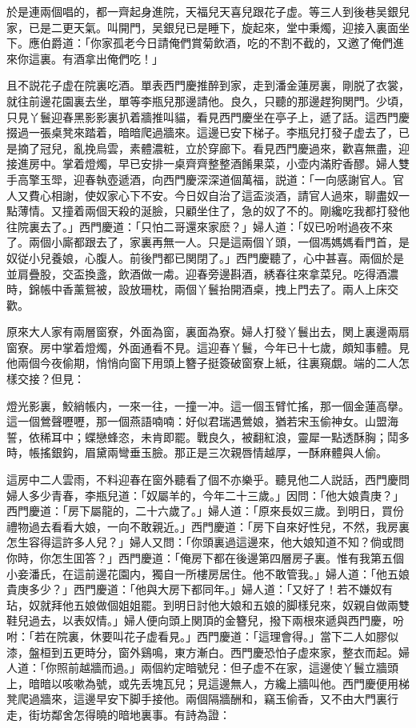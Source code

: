 於是連兩個唱的，都一齊起身進院，天福兒天喜兒跟花子虚。等三人到後巷吴銀兒家，已是二更天氣。叫開門，吴銀兒已是睡下，旋起來，堂中秉燭，迎接入裏面坐下。應伯爵道：「你家孤老今日請俺們賞菊飲酒，吃的不割不截的，又邀了俺們進來你這裏。有酒拿出俺們吃！」

且不説花子虚在院裏吃酒。單表西門慶推醉到家，走到潘金蓮房裏，剛脱了衣裳，就往前邊花園裏去坐，單等李瓶兒那邊請他。良久，只聽的那邊趕狗関門。少頃，只見丫鬟迎春黑影影裏扒着牆推叫貓，看見西門慶坐在亭子上，遞了話。這西門慶掇過一張桌凳來踏着，暗暗爬過牆來。這邊已安下梯子。李瓶兒打發子虚去了，已是摘了冠兒，亂挽烏雲，素體濃粧，立於穿廊下。看見西門慶過來，歡喜無盡，迎接進房中。掌着燈燭，早已安排一桌齊齊整整酒餚果菜，小壶内滿貯香醪。婦人雙手高擎玉斝，迎春執壺遞酒，向西門慶深深道個萬福，説道：「一向感謝官人。官人又費心相謝，使奴家心下不安。今日奴自治了這盃淡酒，請官人過來，聊盡奴一點薄情。又撞着兩個天殺的涎臉，只顧坐住了，急的奴了不的。剛纔吃我都打發他往院裏去了。」西門慶道：「只怕二哥還來家麽？」婦人道：「奴已吩咐過夜不來了。兩個小廝都跟去了，家裏再無一人。只是這兩個丫頭，一個馮媽媽看門首，是奴従小兒養娘，心腹人。前後門都已関閉了。」西門慶聽了，心中甚喜。兩個於是並肩疊股，交盃換盞，飲酒做一䖏。迎春旁邊斟酒，綉春往來拿菜兒。吃得酒濃時，錦帳中香薰鴛被，設放珊枕，兩個丫鬟抬開酒桌，拽上門去了。兩人上床交歡。

原來大人家有兩層窗寮，外面為窗，裏面為寮。婦人打發丫鬟出去，関上裏邊兩扇窗寮。房中掌着燈燭，外面通看不見。這迎春丫鬟，今年已十七歲，頗知事體。見他兩個今夜偷期，悄悄向窗下用頭上簪子挺簽破窗寮上紙，往裏窺覷。端的二人怎樣交接？但見：

燈光影裏，鮫綃帳内，一來一往，一撞一冲。這一個玉臂忙搖，那一個金蓮高擧。這一個鶯聲嚦嚦，那一個燕語喃喃：好似君瑞遇鶯娘，猶若宋玉偷神女。山盟海誓，依稀耳中；蝶戀蜂恣，未肯即罷。戰良久，被翻紅浪，靈犀一點透酥胸；鬦多時，帳搖銀鈎，眉黛兩彎垂玉臉。那正是三次親唇情越厚，一酥麻體與人偷。

這房中二人雲雨，不料迎春在窗外聽看了個不亦樂乎。聽見他二人説話，西門慶問婦人多少青春，李瓶兒道：「奴屬羊的，今年二十三歲。」因問：「他大娘貴庚？」西門慶道：「房下屬龍的，二十六歲了。」婦人道：「原來長奴三歲。到明日，買份禮物過去看看大娘，一向不敢親近。」西門慶道：「房下自來好性兒，不然，我房裏怎生容得這許多人兒？」婦人又問：「你頭裏過這邊來，他大娘知道不知？倘或問你時，你怎生囬答？」西門慶道：「俺房下都在後邊第四層房子裏。惟有我第五個小妾潘氏，在這前邊花園内，獨自一所樓房居住。他不敢管我。」婦人道：「他五娘貴庚多少？」西門慶道：「他與大房下都同年。」婦人道：「又好了！若不嫌奴有玷，奴就拜他五娘做個姐姐罷。到明日討他大娘和五娘的脚樣兒來，奴親自做兩雙鞋兒過去，以表奴情。」婦人便向頭上関頂的金簪兒，撥下兩根來遞與西門慶，吩咐：「若在院裏，休要叫花子虚看見。」西門慶道：「這理會得。」當下二人如膠似漆，盤桓到五更時分，窗外鷄鳴，東方漸白。西門慶恐怕子虚來家，整衣而起。婦人道：「你照前越牆而過。」兩個約定暗號兒：但子虚不在家，這邊使丫鬟立牆頭上，暗暗以咳嗽為號，或先丢塊瓦兒；見這邊無人，方纔上牆叫他。西門慶便用梯凳爬過牆來，這邊早安下脚手接他。兩個隔牆酬和，竊玉偷香，又不由大門裏行走，街坊鄰舍怎得曉的暗地裏事。有詩為證：

